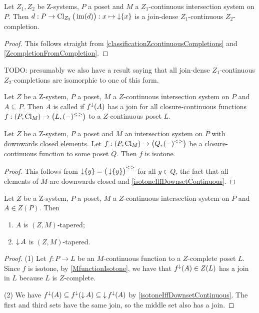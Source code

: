 \begin{proposition} \label{standardFormZcontinuousZcompletion}
Let $Z_1,Z_2$ be $\mathrm{Z}$-systems, $P$ a poset and $M$ a $Z_1$-continuous intersection system on $P$. Then $d: P \to \operatorname{Cl}_{Z_2}\big(\operatorname{im}(d)\big): x\mapsto \operatorname{\downarrow}\{x\}$ is a join-dense $Z_1$-continuous $Z_2$-completion.
\end{proposition}
\begin{proof}
This follows straight from \ref{classificationZcontinuousCompletions} and \ref{ZcompletionFromCompletion}.
\end{proof}

TODO: presumably we also have a result saying that all join-dense $Z_1$-continuous $Z_2$-completions are isomorphic to one of this form.

\begin{definition}
Let $Z$ be a $\mathrm{Z}$-system, $P$ a poset, $M$ a $Z$-continuous intersection system on $P$ and $A\subseteq P$. Then $A$ is called  if $f^\downarrow(A)$ has a join for all closure-continuous functions $f: \sSet{P, \Closure_M}\to \sSet{L, (-)^{\leq\geq}}$ to a $Z$-continuous poset $L$.
\end{definition}

\begin{lemma} \label{MfunctionIsotone}
Let $Z$ be a $\mathrm{Z}$-system, $P$ a poset and $M$ an intersection system on $P$ with downwards closed elements. Let $f: \sSet{P, \Closure_M}\to \sSet{Q, (-)^{\leq\geq}}$ be a closure-continuous function to some poset $Q$. Then $f$ is isotone.
\end{lemma}
\begin{proof}
This follows from $\operatorname{\downarrow}\{y\} = \big(\operatorname{\downarrow}\{y\}\big)^{\leq\geq}$ for all $y\in Q$, the fact that all elements of $M$ are downwards closed and \ref{isotoneIffDownsetContinuous}.
\end{proof}

\begin{lemma} \label{ZsetsTapered}
Let $Z$ be a $\mathrm{Z}$-system, $P$ a poset, $M$ a $Z$-continuous intersection system on $P$ and $A\in Z(P)$. 
Then
\begin{enumerate}
\item $A$ is $(Z,M)$-tapered;
\item $\operatorname{\downarrow} A$ is $(Z,M)$-tapered.
\end{enumerate}
\end{lemma}
\begin{proof}
(1) Let $f: P\to L$ be an $M$-continuous function to a $Z$-complete poset $L$. Since $f$ is isotone, by \ref{MfunctionIsotone}, we have that $f^\downarrow(A)\in Z(L)$ has a join in $L$ because $L$ is $Z$-complete.

(2) We have $f^\downarrow(A) \subseteq f^\downarrow(\operatorname{\downarrow} A) \subseteq \operatorname{\downarrow} f^\downarrow(A)$ by \ref{isotoneIffDownsetContinuous}. The first and third sets have the same join, so the middle set also has a join.
\end{proof}

